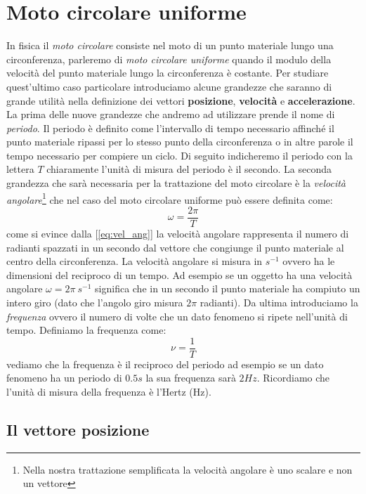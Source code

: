 \documentclass[a4paper,10pt,oneside]{article}
\begin{document}
\thispagestyle{empty}
 \section*{Moto circolare uniforme}
\vspace{1cm}

In fisica il \emph{moto circolare} consiste nel moto di un punto materiale lungo una circonferenza, parleremo di \emph{moto circolare uniforme} quando il modulo della velocità del punto materiale lungo la circonferenza è costante. Per studiare quest'ultimo caso particolare  introduciamo alcune grandezze che saranno di grande utilità nella definizione dei vettori \textbf{posizione}, \textbf{velocità} e \textbf{accelerazione}. La prima delle nuove grandezze che andremo ad utilizzare prende il nome di \emph{periodo}. Il periodo è definito come l'intervallo di tempo necessario affinché il punto materiale ripassi per lo stesso punto della circonferenza o in altre parole il tempo necessario per compiere un ciclo. Di seguito indicheremo il periodo con la lettera $T$ chiaramente l'unità di misura del periodo è il secondo. La seconda grandezza che sarà necessaria per la trattazione del moto circolare è la \emph{velocità angolare}\footnote{Nella nostra trattazione semplificata la velocità angolare è uno scalare e non un vettore} che nel caso del moto circolare uniforme può essere definita come:
\begin{equation}\label{eq:vel_ang}
 \omega=\frac{2\pi}{T}
\end{equation}
come si evince dalla [\ref{eq:vel_ang}] la velocità angolare rappresenta il numero di radianti spazzati in un secondo dal vettore che congiunge il punto materiale al centro della circonferenza. La velocità angolare si misura in $s^{-1}$ ovvero ha le dimensioni del reciproco di un tempo. Ad esempio se un oggetto ha una velocità angolare $\omega=2\pi\ s^{-1}$ significa che in un secondo il punto materiale ha compiuto un intero giro (dato che l'angolo giro misura $2\pi$ radianti). Da ultima introduciamo la \emph{frequenza} ovvero il numero di volte che un dato fenomeno si ripete nell'unità di tempo. Definiamo la frequenza come:
\begin{equation}\label{eq:freq}
 \nu=\frac{1}{T}
\end{equation}
vediamo che la frequenza è il reciproco del periodo ad esempio se un dato fenomeno ha un periodo di $0.5s$ la sua frequenza sarà $2Hz$. Ricordiamo che l'unità di misura della frequenza è l'Hertz (Hz).

\subsection*{Il vettore posizione}
\end{document}

